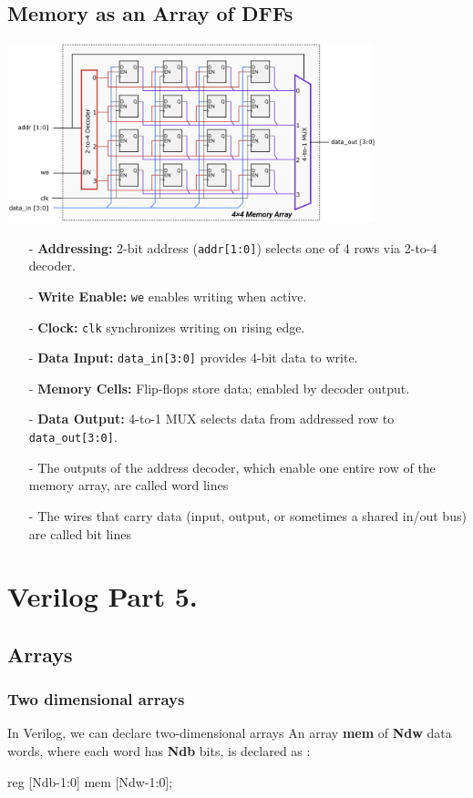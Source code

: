 \documentclass[12pt,openany]{book}
\begin{document}
\subsection{Memory as an Array of DFFs }
\begin{center}
	\includegraphics[width=0.8\textwidth]{circuits/16.2.6.png}
\end{center}
\begin{itemize}
    \item[-] \textbf{Addressing:} 2-bit address (\texttt{addr[1:0]}) selects one of 4 rows via 2-to-4 decoder.
    \item[-] \textbf{Write Enable:} \texttt{we} enables writing when active.
    \item[-] \textbf{Clock:} \texttt{clk} synchronizes writing on rising edge.
    \item[-] \textbf{Data Input:} \texttt{data\_in[3:0]} provides 4-bit data to write.
    \item[-] \textbf{Memory Cells:} Flip-flops store data; enabled by decoder output.
    \item[-] \textbf{Data Output:} 4-to-1 MUX selects data from addressed row to \texttt{data\_out[3:0]}.
\end{itemize}
\begin{itemize}
	\item[-] The outputs of the address decoder, which enable one entire row of the memory array, are called word lines
	\item[-]The wires that carry data (input, output, or sometimes a shared in/out bus) are called bit lines
\end{itemize}
\section{Verilog Part 5.}
\subsection{Arrays}
\subsubsection{Two dimensional arrays}
In Verilog, we can declare two-dimensional arrays
An array \textbf{mem} of \textbf{Ndw} data words, where each word has \textbf{Ndb} bits, is declared as :
\begin{center}
	\begin{vhdl}
reg [Ndb-1:0] mem [Ndw-1:0];
	\end{vhdl}
\end{center}
\end{document}
